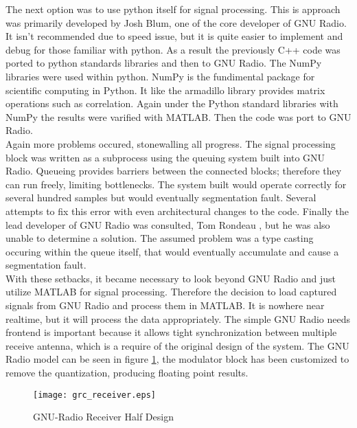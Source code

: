 The next option was to use python itself for signal processing.  This is approach was primarily developed by Josh Blum, one of the core developer of GNU Radio.  It isn't recommended due to speed issue, but it is quite easier to implement and debug for those familiar with python.  As a result the previously C++ code was ported to python standards libraries and then to GNU Radio.  The NumPy libraries were used within python.  NumPy is the fundimental package for scientific computing in Python\cite{numpy}.  It like the armadillo library provides matrix operations such as correlation.  Again under the Python standard libraries with NumPy the results were varified with MATLAB.  Then the code was port to GNU Radio.\\

Again more problems occured, stonewalling all progress.  The signal processing block was written as a subprocess using the queuing system built into GNU Radio.  Queueing provides barriers between the connected blocks; therefore they can run freely, limiting bottlenecks. The system built would operate correctly for several hundred samples but would eventually segmentation fault.  Several attempts to fix this error with even architectural changes to the code.  Finally the lead developer of GNU Radio was consulted, Tom Rondeau \cite{tomrondeau}, but he was also unable to determine a solution.  The assumed problem was a type casting occuring within the queue itself, that would eventually accumulate and cause a segmentation fault.\\

With these setbacks, it became necessary to look beyond GNU Radio and just utilize MATLAB for signal processing.  Therefore the decision to load captured signals from GNU Radio and process them in MATLAB.  It is nowhere near realtime, but it will process the data appropriately.  The simple GNU Radio needs frontend is important because it allows tight synchronization between multiple receive antenna, which is a require of the original design of the system.  The GNU Radio model can be seen in figure \ref{grc_receiver}, the modulator block has been customized to remove the quantization, producing floating point results.\\

\begin{figure}[!ht]\label{grc_receiver}
\centering
\texttt{[image: grc\_receiver.eps]}
\caption{GNU-Radio Receiver Half Design}
\end{figure}

